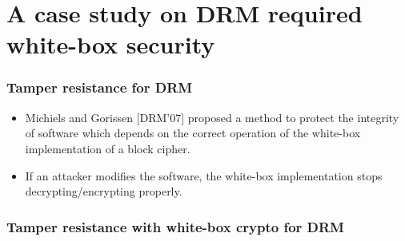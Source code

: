 \documentclass{beamer}
\begin{document}
\section{A case study on DRM required white-box security}

\frame
{
\frametitle{Tamper resistance for DRM}

\begin{itemize}
\item Michiels and Gorissen [DRM'07] proposed a method to protect the integrity of software which depends on the correct operation of the white-box implementation of a block cipher.
\item If an attacker modifies the software, the white-box implementation stops decrypting/encrypting properly.
\end{itemize}

}

\frame
{
\frametitle{Tamper resistance with white-box crypto for DRM}

\begin{center}
\end{center}

}
\end{document}
